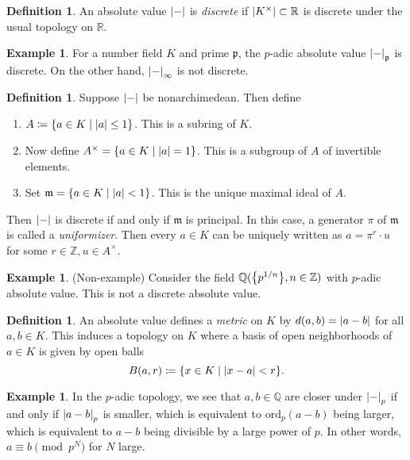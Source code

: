 \documentclass[leqno, openany]{memoir}
\theoremstyle{definition}
\newtheorem{defn}[thm]{Definition}
\newtheorem{exm}[thm]{Example}
\theoremstyle{remark}
\theoremstyle{plain}
\theoremstyle{definition}
\theoremstyle{remark}
\newcommand{\R}{\mathbb{R}}
\newcommand{\Z}{\mathbb{Z}}
\newcommand{\Q}{\mathbb{Q}}
\newcommand{\mf}[1]{\mathfrak{#1}}
\newcommand{\mr}[1]{\mathrm{#1}}
\begin{document}
\begin{defn} An absolute value $\abs{-}$ is \textit{discrete} if
$\abs{K^{\times}} \subset \R$ is discrete under the usual topology on $\R$.
\end{defn}

\begin{exm} For a number field $K$ and prime $\mf{p}$, the $p$-adic absolute
value $\abs{-}_{\mf{p}}$ is discrete. On the other hand, $\abs{-}_{\infty}$ is
not discrete.  \end{exm}

\begin{defn} Suppose $\abs{-}$ be nonarchimedean. Then define \begin{enumerate}
    \item $A \coloneqq \qty{a \in K \mid \abs{a} \leq 1}$. This is a subring of
        $K$.  \item Now define $A^{\times} = \qty{a \in K \mid \abs{a} = 1}$.
        This is a subgroup of $A$ of invertible elements.  \item Set $\mf{m} =
\qty{a \in K \mid \abs{a} < 1}$. This is the unique maximal ideal of $A$.
\end{enumerate} Then $\abs{-}$ is discrete if and only if $\mf{m}$ is
principal. In this case, a generator $\pi$ of $\mf{m}$ is called a
\textit{uniformizer}. Then every $a \in K$ can be uniquely written as $a =
\pi^r \cdot u$ for some $r \in \Z, u \in A^{\times}$.  \end{defn}

\begin{exm}(Non-example) Consider the field $\Q(\qty{p^{1/n}}, n \in \Z)$ with
$p$-adic absolute value. This is not a discrete absolute value.  \end{exm}

\begin{defn} An absolute value defines a \textit{metric} on $K$ by $d(a,b) =
    \abs{a-b}$ for all $a,b \in K$. This induces a topology on $K$ where a
    basis of open neighborhoods of $a \in K$ is given by open balls \[ B(a,r)
    \coloneqq \qty{x \in K \mid \abs{x-a} < r}. \] \end{defn}

\begin{exm} In the $p$-adic topology, we see that $a,b \in \Q$ are closer under
    $\abs{-}_p$ if and only if $\abs{a-b}_{p}$ is smaller, which is equivalent
    to $\mr{ord}_p(a-b)$ being larger, which is equivalent to $a-b$ being
    divisible by a large power of $p$. In other words, $a \equiv b \pmod p^N$
    for $N$ large.  \end{exm}
\end{document}
